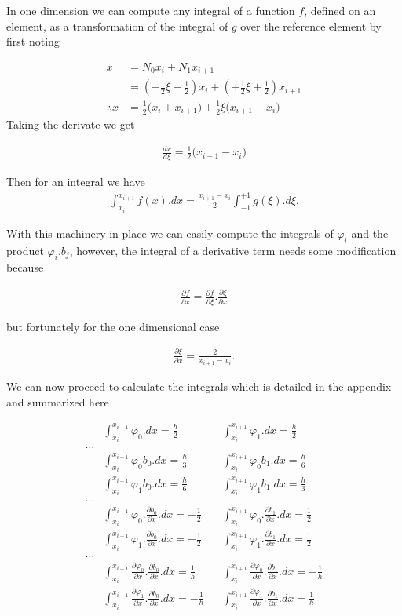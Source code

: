 \documentclass[11pt,letterpaper,titlepage]{article}
\numberwithin{equation}{section}
\newcommand{\beq}{\begin{equation*}
\begin{aligned}}
\newcommand{\eeq}{\end{aligned}
\end{equation*}}
\newcommand{\beqn}{\begin{equation}
	\begin{aligned}}
\newcommand{\eeqn}{\end{aligned}
	\end{equation}}
\begin{document}
In one dimension we can compute any integral of a function $f$, defined on an element, as a transformation of the integral of $g$ over the reference element by first noting

\beq
x &= N_0 x_i + N_1 x_{i+1} \\
 &= (-\frac{1}{2}\xi+\frac{1}{2}) x_i + (+\frac{1}{2}\xi+\frac{1}{2})x_{i+1} \\
 \therefore
 x &= \frac{1}{2}\biggr( x_i + x_{i+1} \biggr) 
 + \frac{1}{2}\xi \biggr( x_{i+1}-x_i    \biggr)
\eeq 
Taking the derivate we get 

\beq
\frac{dx}{d\xi} = \frac{1}{2}\biggr( x_{i+1}-x_i    \biggr)
\eeq 

Then for an integral we have
\beq
\int_{x_i}^{x_{i+1}} f(x).dx =\frac{x_{i+1}-x_i}{2}\int_{-1}^{+1} g(\xi).d\xi.
\eeq

With this machinery in place we can easily compute the integrals of $\varphi_i$ and the product $\varphi_i.b_j$, however, the integral of a derivative term needs some modification because

\beq
\frac{\partial f}{\partial x} = \frac{\partial f}{\partial \xi} 
.\frac{\partial \xi}{\partial x}
\eeq 

but fortunately for the one dimensional case 

\beq
\frac{\partial \xi}{\partial x}  = \frac{2}{x_{i+1}-x_i}.
\eeq 

We can now proceed to calculate the integrals which is detailed in the appendix and summarized here

\beqn
&\int_{x_i}^{x_{i+1}} \varphi_0 .dx  = \frac{h}{2}  \quad \quad
&&\int_{x_i}^{x_{i+1}} \varphi_1 .dx  = \frac{h}{2} \\
\dots \\
&\int_{x_i}^{x_{i+1}} \varphi_0 b_0.dx =\frac{h}{3}
&&\int_{x_i}^{x_{i+1}} \varphi_0 b_1.dx =\frac{h}{6} \\
&\int_{x_i}^{x_{i+1}} \varphi_1 b_0.dx =\frac{h}{6} 
&&\int_{x_i}^{x_{i+1}} \varphi_1 b_1.dx =\frac{h}{3} \\
\dots \\
&\int_{x_i}^{x_{i+1}} \varphi_0.\frac{\partial b_0}{\partial x}.dx = -\frac{1}{2}
&&\int_{x_i}^{x_{i+1}} \varphi_0.\frac{\partial b_1}{\partial x}.dx = \frac{1}{2} \\
&\int_{x_i}^{x_{i+1}} \varphi_1.\frac{\partial b_0}{\partial x}.dx = -\frac{1}{2} 
&&\int_{x_i}^{x_{i+1}} \varphi_1.\frac{\partial b_1}{\partial x}.dx = \frac{1}{2} \\
\dots \\
&\int_{x_i}^{x_{i+1}} \frac{\partial \varphi_0}{\partial x}.\frac{\partial b_0}{\partial x}.dx = \frac{1}{h}
&&\int_{x_i}^{x_{i+1}} \frac{\partial \varphi_0}{\partial x}.\frac{\partial b_1}{\partial x}.dx =- \frac{1}{h}\\
&\int_{x_i}^{x_{i+1}} \frac{\partial \varphi_1}{\partial x}.\frac{\partial b_0}{\partial x}.dx = -\frac{1}{h} 
&&\int_{x_i}^{x_{i+1}} \frac{\partial \varphi_1}{\partial x}.\frac{\partial b_1}{\partial x}.dx = \frac{1}{h} \\
\eeqn
\end{document}
